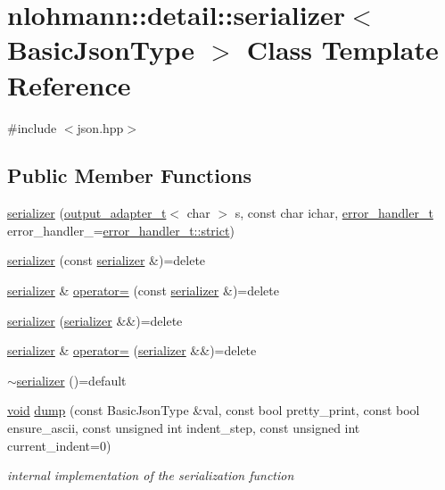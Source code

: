 \hypertarget{classnlohmann_1_1detail_1_1serializer}{}\section{nlohmann\+::detail\+::serializer$<$ Basic\+Json\+Type $>$ Class Template Reference}
\label{classnlohmann_1_1detail_1_1serializer}


{\ttfamily \#include $<$json.\+hpp$>$}

\subsection*{Public Member Functions}
\begin{DoxyCompactItemize}
\item 
\mbox{\hyperlink{classnlohmann_1_1detail_1_1serializer_ac010525281d97867ee842da37294fe83}{serializer}} (\mbox{\hyperlink{namespacenlohmann_1_1detail_a9b680ddfb58f27eb53a67229447fc556}{output\+\_\+adapter\+\_\+t}}$<$ char $>$ s, const char ichar, \mbox{\hyperlink{namespacenlohmann_1_1detail_a5a76b60b26dc8c47256a996d18d967df}{error\+\_\+handler\+\_\+t}} error\+\_\+handler\+\_\+=\mbox{\hyperlink{namespacenlohmann_1_1detail_a5a76b60b26dc8c47256a996d18d967dfa2133fd717402a7966ee88d06f9e0b792}{error\+\_\+handler\+\_\+t\+::strict}})
\item 
\mbox{\hyperlink{classnlohmann_1_1detail_1_1serializer_ae3771351ec4cb892bec707edeb56dc31}{serializer}} (const \mbox{\hyperlink{classnlohmann_1_1detail_1_1serializer}{serializer}} \&)=delete
\item 
\mbox{\hyperlink{classnlohmann_1_1detail_1_1serializer}{serializer}} \& \mbox{\hyperlink{classnlohmann_1_1detail_1_1serializer_a5f14c33012477b9f9876dc54d97009a0}{operator=}} (const \mbox{\hyperlink{classnlohmann_1_1detail_1_1serializer}{serializer}} \&)=delete
\item 
\mbox{\hyperlink{classnlohmann_1_1detail_1_1serializer_a28081304e70cca6b3042c101ee5c498c}{serializer}} (\mbox{\hyperlink{classnlohmann_1_1detail_1_1serializer}{serializer}} \&\&)=delete
\item 
\mbox{\hyperlink{classnlohmann_1_1detail_1_1serializer}{serializer}} \& \mbox{\hyperlink{classnlohmann_1_1detail_1_1serializer_acaafe3436ee5fb74777eb4132a88c513}{operator=}} (\mbox{\hyperlink{classnlohmann_1_1detail_1_1serializer}{serializer}} \&\&)=delete
\item 
\mbox{\hyperlink{classnlohmann_1_1detail_1_1serializer_aa6c62b51cbebb185307df851dc0167f0}{$\sim$serializer}} ()=default
\item 
\mbox{\hyperlink{namespacenlohmann_1_1detail_a59fca69799f6b9e366710cb9043aa77d}{void}} \mbox{\hyperlink{classnlohmann_1_1detail_1_1serializer_a95460ebd1a535a543e5a0ec52e00f48b}{dump}} (const Basic\+Json\+Type \&val, const bool pretty\+\_\+print, const bool ensure\+\_\+ascii, const unsigned int indent\+\_\+step, const unsigned int current\+\_\+indent=0)
\begin{DoxyCompactList}\small\item\em internal implementation of the serialization function \end{DoxyCompactList}\end{DoxyCompactItemize}
